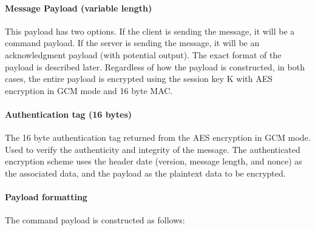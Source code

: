 \documentclass[12pt]{article}
\begin{document}
\paragraph{Message Payload (variable length)}

This payload has two options. If the client is sending the message, it will be a command payload. If the server is sending the message, it will be an acknowledgment payload (with potential output). The exact format of the payload is described later. Regardless of how the payload is constructed, in both cases, the entire payload is encrypted using the session key K with AES encryption in GCM mode and 16 byte MAC.

\paragraph{Authentication tag (16 bytes)}

The 16 byte authentication tag returned from the AES encryption in GCM mode. Used to verify the authenticity and integrity of the message. The authenticated encryption scheme uses the header date (version, message length, and nonce) as the associated data, and the payload as the plaintext data to be encrypted.

\paragraph{Payload formatting}

\noindent The command payload is constructed as follows:
\end{document}

